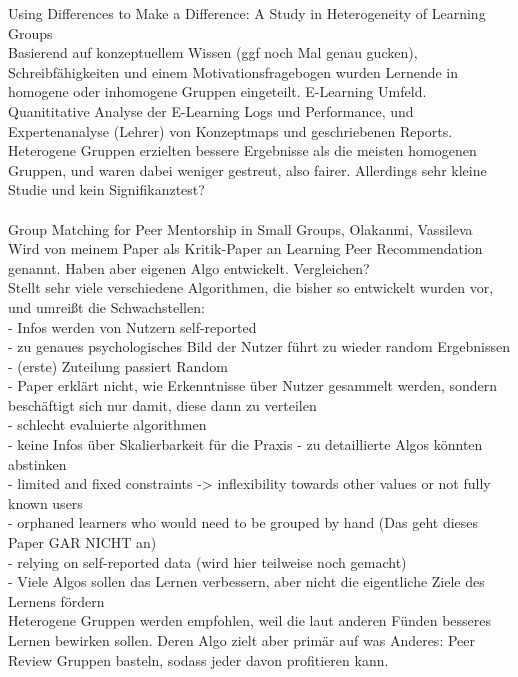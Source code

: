 \documentclass[nochapterpage,bigchapter,linedtoc,longdoc,colorback,accentcolor=tud3b]{tudreport}
\begin{document}
Using Differences to Make a Difference: A Study in Heterogeneity of Learning Groups \cite{manske2015using}\\
Basierend auf konzeptuellem Wissen (ggf noch Mal genau gucken), Schreibfähigkeiten und einem Motivationsfragebogen wurden Lernende in homogene oder inhomogene Gruppen eingeteilt. E-Learning Umfeld. Quanititative Analyse der E-Learning Logs und Performance, und Expertenanalyse (Lehrer) von Konzeptmaps und geschriebenen Reports. Heterogene Gruppen erzielten bessere Ergebnisse als die meisten homogenen Gruppen, und waren dabei weniger gestreut, also fairer. Allerdings sehr kleine Studie und kein Signifikanztest?\\
\\

Group Matching for Peer Mentorship in Small Groups, Olakanmi, Vassileva \cite{olakanmi2017group}\\
Wird von meinem Paper als Kritik-Paper an Learning Peer Recommendation genannt. Haben aber eigenen Algo entwickelt. Vergleichen?\\
Stellt sehr viele verschiedene Algorithmen, die bisher so entwickelt wurden vor, und umreißt die Schwachstellen:\\
- Infos werden von Nutzern self-reported\\
- zu genaues psychologisches Bild der Nutzer führt zu wieder random Ergebnissen\\
- (erste) Zuteilung passiert Random\\
- Paper erklärt nicht, wie Erkenntnisse über Nutzer gesammelt werden, sondern beschäftigt sich nur damit, diese dann zu verteilen\\
- schlecht evaluierte algorithmen\\
- keine Infos über Skalierbarkeit für die Praxis - zu detaillierte Algos könnten abstinken\\
- limited and fixed constraints -> inflexibility towards other values or not fully known users\\
- orphaned learners who would need to be grouped by hand (Das geht dieses Paper GAR NICHT an)\\
- relying on self-reported data (wird hier teilweise noch gemacht)\\
- Viele Algos sollen das Lernen verbessern, aber nicht die eigentliche Ziele des Lernens fördern\\
Heterogene Gruppen werden empfohlen, weil die laut anderen Fünden besseres Lernen bewirken sollen. Deren Algo zielt aber primär auf was Anderes: Peer Review Gruppen basteln, sodass jeder davon profitieren kann.
\end{document}
